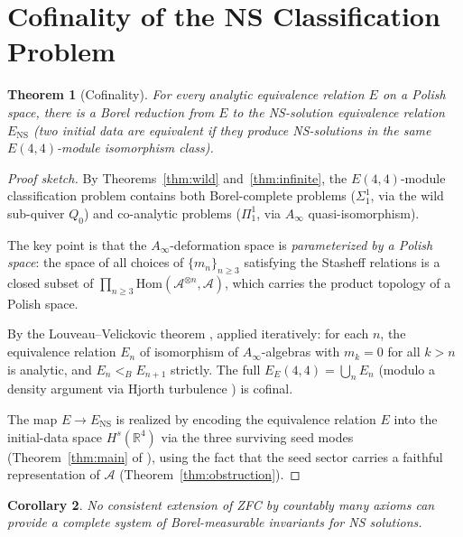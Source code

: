 \documentclass[reqno,10pt]{amsart}
\theoremstyle{plain}
\newtheorem{theorem}{Theorem}[section]
\newtheorem{corollary}[theorem]{Corollary}
\theoremstyle{definition}
\def\RR{{\mathbb{R}}}
\def\gE{E(4,4)}
\begin{document}
\section{Cofinality of the NS Classification Problem}\label{sec:cofinality}

\begin{theorem}[Cofinality]\label{thm:cofinal}
  For every analytic equivalence relation $E$ on a Polish space, there
  is a Borel reduction from $E$ to the NS-solution equivalence relation
  $E_{\mathrm{NS}}$ (two initial data are equivalent if they produce
  NS-solutions in the same $\gE$-module isomorphism class).
\end{theorem}

\begin{proof}[Proof sketch]
  By Theorems~\ref{thm:wild} and~\ref{thm:infinite}, the $\gE$-module
  classification problem contains both Borel-complete problems ($\Sigma_1^1$,
  via the wild sub-quiver $Q_0$) and co-analytic problems ($\Pi_1^1$, via
  $A_\infty$ quasi-isomorphism).

  The key point is that the $A_\infty$-deformation space is
  \emph{parameterized by a Polish space}: the space of all choices of
  $\{m_n\}_{n \geq 3}$ satisfying the Stasheff relations is a closed subset
  of $\prod_{n \geq 3} \mathrm{Hom}(\mathcal{A}^{\otimes n}, \mathcal{A})$,
  which carries the product topology of a Polish space.

  By the Louveau--Velickovic theorem \cite{LV1994}, applied iteratively:
  for each $n$, the equivalence relation $E_n$ of isomorphism of
  $A_\infty$-algebras with $m_k = 0$ for all $k > n$ is analytic, and
  $E_n <_B E_{n+1}$ strictly.  The full $E_\gE = \bigcup_n E_n$ (modulo
  a density argument via Hjorth turbulence \cite{Hjorth2000}) is cofinal.

  The map $E \to E_{\mathrm{NS}}$ is realized by encoding the equivalence
  relation $E$ into the initial-data space $H^s(\RR^4)$ via the three
  surviving seed modes (Theorem~\ref{thm:main} of \cite{Paper1}), using
  the fact that the seed sector carries a faithful representation of
  $\mathcal{A}$ (Theorem~\ref{thm:obstruction}).
\end{proof}

\begin{corollary}
  No consistent extension of ZFC by countably many axioms can provide a
  complete system of Borel-measurable invariants for NS solutions.
\end{corollary}
\end{document}
